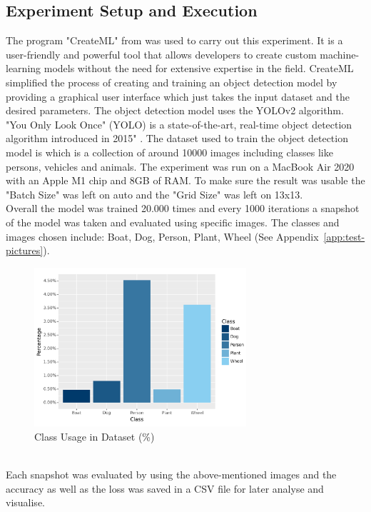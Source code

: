 \subsection{Experiment Setup and Execution}
The program "CreateML" from \cite{Apple} was used to carry out this experiment. It is a user-friendly and powerful 
tool that allows developers to create custom machine-learning models without the need for extensive expertise in the field.
CreateML simplified the process of creating and training an object detection model by providing a graphical user interface which 
just takes the input dataset and the desired parameters. The object detection model uses the YOLOv2 \parencite{Jaina} algorithm.
"You Only Look Once" (YOLO) is a state-of-the-art, real-time object detection algorithm introduced in 2015" \parencite{Keita2022}. 
The dataset used to train the object detection model is  which is a collection of around 10000 images including classes
like persons, vehicles and animals. The experiment was run on a MacBook Air 2020 with an Apple M1 chip and 8GB of RAM. To make sure the 
result was usable the "Batch Size" was left on auto and the "Grid Size" was left on 13x13.\\

\newpage
Overall the model was trained 20.000 times and every 1000 iterations a snapshot of the model was taken and evaluated using
specific images. 
The classes and images chosen include: Boat, Dog, Person, Plant, Wheel (See Appendix~\ref{app:test-pictures}).
\begin{figure}[h]
  \centering
  \includegraphics[width=0.70\textwidth]{../Data/distribution-classes-barchart.png}
  \caption{Class Usage in Dataset (\%)}
  \label{fig:class-usage-in-dataset}
\end{figure}
\\
Each snapshot was evaluated by using the above-mentioned images and the accuracy as well as the loss was saved in a CSV file for later 
analyse and visualise.
\\
